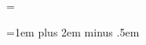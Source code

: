 

\newtoks\t@names   \t@names={}
\newcount\tabn@m   {}
\def\tab@type{tab}
\newbox\tab@box
\let\tab@list=\empty
\newwrite\tab@write  \def\tab@file{\tab@file\tab@write0}

\outer{}
\outer{}
\outer{}
\def\tab@init{\if@t\tab@acs\tab@pref\tab@reset\tab@@reset\tabz@}
\def\tabz@{\gz@\tabn@m}

\outer{}
\outer{}

\def\tab{\bf@t\tab@\@tab}
\def\TAB{\bf@t\tab@\@TAB}
\def\ttab{\bf@t\ttab@\@tab}
\def\TTAB{\bf@t\ttab@\@TAB}

\def\@tab{\ef@t\tabn@m\tab@pref\relax}
\def\@TAB#1{\ef@t\tabn@m\tab@pref{\def@name\t@names#1{\thef@tn@m}}}

\def\tab@{\@store1{\thef@tn@m .}}
\def\ttab@{\@sstore1\tabpref{\thef@tn@m}}
\def\tabadd{\@add1}

\def\qutab{\case@abbr\tababbr\num@lett\quote@all}

\outer{}
\outer{}
\outer{}
\outer\def\tabrestore{\all@restore\t@names}

\outer{}
\def\TAB@ext{\@@ext\@TAB\@extf@t}


\newskip\htabskip   \htabskip=1em plus 2em minus .5em
\newdimen\vtabskip  \vtabskip=2.5pt
\newbox\tab@top   \newbox\tab@bot

\let\@hrule=\hrule
\let\@halign=\halign
\let\@valign=\valign
\let\@span=\span
\let\@omit=\omit

\def\@@span{\@span\@omit\@span}
\def\@@@span{\@span\@omit\@@span}

\def\sp@n{\span\@omit\advance\mscount\m@ne} %

\def\table#1#{\vbox\bgroup\offinterlineskip
  \toks@ii{#1\bgroup \unhcopy\tab@top \unhcopy\tab@bot
    ##}\afterassignment\tab@preamble \@eat}


\def\tab@preamble#1\cr{\let\tab@@vrule\tab@repeat
  \let\tab@amp@\empty \let\tab@amp\empty \let\span@\@@span
  \the\toks@}
\def\tab@space{\tab@test{ }{}\tab@vrule}                 %
\def\tab@vrule{\tab@test\vrule{\tab@add\vrule}%
  \tab@@vrule}
\def\tab@repeat{\tab@test&{\tab@add&%
    \let\tab@@vrule\tab@template \let\tab@amp@\tab@@amp
    \let\tab@amp&\let\span@\@@@span}\tab@template}
\def\tab@template#1&{\tab@add{\@span\tab@amp@
    \tabskip\htabskip&\tab@setup#1&\tabskip\z@skip##}%
  \tab@test\cr{\let\tab@@vrule\tab@exec}\tab@space}      %
\def\tab@@amp{&##}


